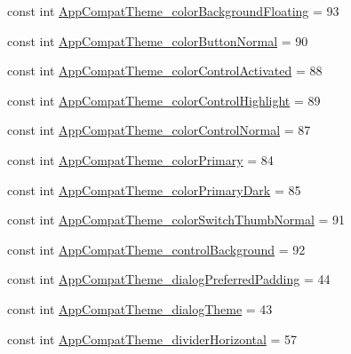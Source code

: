 \begin{DoxyCompactItemize}
\item 
const int \mbox{\hyperlink{class_f_w_p_s___app_1_1_droid_1_1_resource_1_1_styleable_ad286b90a021271af66d929c7e6cd4006}{App\+Compat\+Theme\+\_\+color\+Background\+Floating}} = 93
\item 
const int \mbox{\hyperlink{class_f_w_p_s___app_1_1_droid_1_1_resource_1_1_styleable_a3b8a6a1aa7fa3dd56a99f3a3677af994}{App\+Compat\+Theme\+\_\+color\+Button\+Normal}} = 90
\item 
const int \mbox{\hyperlink{class_f_w_p_s___app_1_1_droid_1_1_resource_1_1_styleable_a24781d55dd5ae46e42f5333084624b5b}{App\+Compat\+Theme\+\_\+color\+Control\+Activated}} = 88
\item 
const int \mbox{\hyperlink{class_f_w_p_s___app_1_1_droid_1_1_resource_1_1_styleable_a2dea57735059929cd992dcb09e17e82c}{App\+Compat\+Theme\+\_\+color\+Control\+Highlight}} = 89
\item 
const int \mbox{\hyperlink{class_f_w_p_s___app_1_1_droid_1_1_resource_1_1_styleable_a4d5242a50c60bed8725d5aa881e5111b}{App\+Compat\+Theme\+\_\+color\+Control\+Normal}} = 87
\item 
const int \mbox{\hyperlink{class_f_w_p_s___app_1_1_droid_1_1_resource_1_1_styleable_ad026b146169956f5777055d6ed35f6c9}{App\+Compat\+Theme\+\_\+color\+Primary}} = 84
\item 
const int \mbox{\hyperlink{class_f_w_p_s___app_1_1_droid_1_1_resource_1_1_styleable_ab7015ed7a8b4593b2066963b27b5e553}{App\+Compat\+Theme\+\_\+color\+Primary\+Dark}} = 85
\item 
const int \mbox{\hyperlink{class_f_w_p_s___app_1_1_droid_1_1_resource_1_1_styleable_a1a07b050dcae2e63b01d42cc0471508a}{App\+Compat\+Theme\+\_\+color\+Switch\+Thumb\+Normal}} = 91
\item 
const int \mbox{\hyperlink{class_f_w_p_s___app_1_1_droid_1_1_resource_1_1_styleable_ade332dec9a38d628936f41f4989e19b9}{App\+Compat\+Theme\+\_\+control\+Background}} = 92
\item 
const int \mbox{\hyperlink{class_f_w_p_s___app_1_1_droid_1_1_resource_1_1_styleable_af5d17dc9bc870307a731aa137016d287}{App\+Compat\+Theme\+\_\+dialog\+Preferred\+Padding}} = 44
\item 
const int \mbox{\hyperlink{class_f_w_p_s___app_1_1_droid_1_1_resource_1_1_styleable_a3a0f0d05e182d81ff640cf2999649253}{App\+Compat\+Theme\+\_\+dialog\+Theme}} = 43
\item 
const int \mbox{\hyperlink{class_f_w_p_s___app_1_1_droid_1_1_resource_1_1_styleable_a30c14c4512398567f26a54b134e7cc78}{App\+Compat\+Theme\+\_\+divider\+Horizontal}} = 57

\end{DoxyCompactItemize}
